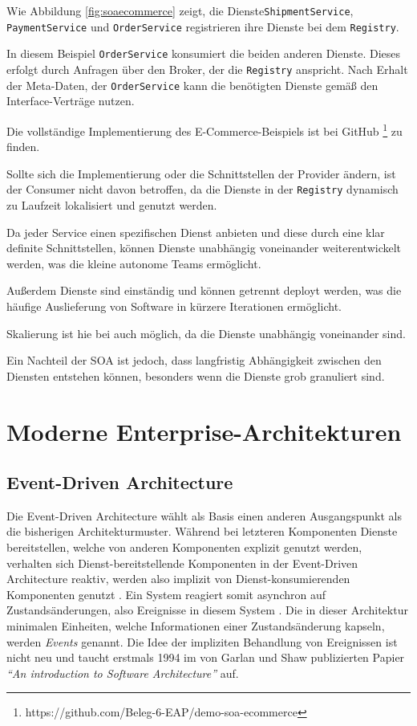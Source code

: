 \documentclass[acmtog]{acmart}
\begin{document}
Wie Abbildung \ref{fig:soaecommerce} zeigt, die Dienste\texttt{ShipmentService},
\texttt{PaymentService} und \texttt{OrderService} registrieren ihre Dienste
bei dem \texttt{Registry}.

In diesem Beispiel \texttt{OrderService} konsumiert die beiden anderen Dienste.
 Dieses erfolgt durch Anfragen über den Broker, der die \texttt{Registry} anspricht.
Nach Erhalt der Meta-Daten, der \texttt{OrderService} kann die benötigten Dienste
 gemäß den Interface-Verträge nutzen.

Die vollständige Implementierung des E-Commerce-Beispiels ist bei GitHub \footnote{https://github.com/Beleg-6-EAP/demo-soa-ecommerce} zu finden.

Sollte sich die Implementierung oder die Schnittstellen der Provider ändern, ist
der Consumer nicht davon betroffen, da die Dienste in der \texttt{Registry}
 dynamisch zu Laufzeit lokalisiert und genutzt werden.

Da jeder Service einen spezifischen Dienst anbieten und diese durch eine
 klar definite Schnittstellen, können Dienste unabhängig voneinander
 weiterentwickelt werden, was die kleine autonome Teams ermöglicht.

Außerdem Dienste sind einständig und können getrennt deployt werden,
 was die häufige Auslieferung von Software in kürzere Iterationen ermöglicht.

Skalierung ist hie bei auch möglich, da die Dienste unabhängig voneinander sind.

Ein Nachteil der SOA ist jedoch, dass langfristig Abhängigkeit zwischen den Diensten
entstehen können, besonders wenn die Dienste grob granuliert sind.
\section{Moderne Enterprise-Architekturen}

\subsection{Event-Driven Architecture}
Die Event-Driven Architecture wählt als Basis einen anderen Ausgangspunkt als die bisherigen Architekturmuster.
Während bei letzteren Komponenten Dienste bereitstellen, welche von anderen Komponenten explizit genutzt werden,
verhalten sich Dienst-bereitstellende Komponenten in der Event-Driven Architecture reaktiv,
werden also implizit von Dienst-konsumierenden Komponenten genutzt \cite{garlanShawImplizit}.
Ein System reagiert somit asynchron auf Zustandsänderungen, also Ereignisse in diesem System \cite{eda}.
Die in dieser Architektur minimalen Einheiten, welche Informationen einer Zustandsänderung kapseln, werden \textit{Events} genannt.
Die Idee der impliziten Behandlung von Ereignissen ist nicht neu und taucht erstmals 1994 im von Garlan und Shaw publizierten Papier
\textit{\enquote{An introduction to Software Architecture}} auf.
\end{document}

